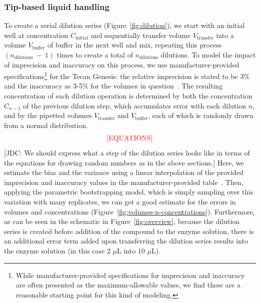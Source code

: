 \documentclass[aps,pre,twocolumn,nofootinbib,superscriptaddress,linenumbers]{revtex4-1}
\begin{document}
\subsubsection*{Tip-based liquid handling}

To create a serial dilution series (Figure~\ref{fig:dilution}), we start with an initial well at concentration $C_\mathrm{initial}$ and sequentially transfer volume $V_\mathrm{transfer}$ into a volume $V_\mathrm{buffer}$ of buffer in the next well and mix, repeating this process $(n_\mathrm{dilutions}~-~1)$ times to create a total of $n_\mathrm{dilutions}$ dilutions. 
To model the impact of imprecision and inaccuracy on this process, we use manufacturer-provided specifications\footnote{While manufacturer-provided specifications for imprecision and inaccuracy are often presented as the maximum-allowable values, we find these are a reasonable starting point for this kind of modeling.} for the Tecan Genesis: the relative imprecision is stated to be 3\% and the inaccuracy as 3-5\% for the volumes in question~\cite{_tecan_2001}. 
The resulting concentration of each dilution operation is determined by both the concentration $C_{n-1}$ of the previous dilution step, which accumulates error with each dilution $n$, and by the pipetted volumes $V_\mathrm{transfer}$ and $V_\mathrm{buffer}$, each of which is randomly drawn from a normal distribution.
\begin{eqnarray}
\color{red}
\mathrm{[EQUATIONS]}
\end{eqnarray}
{\color{red}[JDC: We should express what a step of the dilution series looks like in terms of the equations for drawing random numbers as in the above sections.]}
Here, we estimate the bias and the variance using a linear interpolation of the provided imprecision and inaccuracy values in the manufacturer-provided table~\cite{_tecan_2001}.
Then, applying the parametric bootstrapping model, which is simply sampling over this variation with many replicates, we can get a good estimate for the errors in volumes and concentrations (Figure~\ref{fig:volumes-n-concentrations}).
Furthermore, as can be seen in the schematic in Figure~\ref{fig:overview}, because the dilution series is created before addition of the compound to the enzyme solution, there is an additional error term added upon transferring the dilution series results into the enzyme solution (in this case 2 $\mu$L into 10 $\mu$L).
\end{document}
